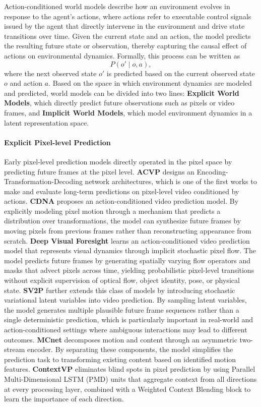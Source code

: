 Action-conditioned world models describe how an environment evolves in response to the agent's actions, where actions refer to executable control signals issued by the agent that directly intervene in the environment and drive state transitions over time. Given the current state and an action, the model predicts the resulting future state or observation, thereby capturing the causal effect of actions on environmental dynamics. Formally, this process can be written as 
$$P\left(o' \mid o, a\right), $$
where the next observed state $o'$ is predicted based on the current observed state $o$ and action $a$. Based on the space in which environment dynamics are modeled and predicted, world models can be divided into two lines: \textbf{Explicit World Models}, which directly predict future observations such as pixels or video frames, and \textbf{Implicit World Models}, which model environment dynamics in a latent representation space.

\paragraph{Explicit Pixel-level Prediction}

Early pixel-level prediction models directly operated in the pixel space by predicting future frames at the pixel level. \textbf{ACVP} \cite{ACVP} designs an Encoding-Transformation-Decoding network architectures, which is one of the first works to make and evaluate long-term predictions on pixel-level video conditioned by actions. \textbf{CDNA} \cite{PixelLevel2} proposes an action-conditioned video prediction model. By explicitly modeling pixel motion through a mechanism that predicts a distribution over transformations, the model can synthesize future frames by moving pixels from previous frames rather than reconstructing appearance from scratch. \textbf{Deep Visual Foresight} \cite{finn2017deepvisualforesightplanning} learns an action-conditioned video prediction model that represents visual dynamics through implicit stochastic pixel flow. The model predicts future frames by generating spatially varying flow operators and masks that advect pixels across time, yielding probabilistic pixel-level transitions without explicit supervision of optical flow, object identity, pose, or physical state. \textbf{SV2P} \cite{babaeizadeh2018stochasticvariationalvideoprediction} further extends this class of models by introducing stochastic variational latent variables into video prediction. By sampling latent variables, the model generates multiple plausible future frame sequences rather than a single deterministic prediction, which is particularly important in real-world and action-conditioned settings where ambiguous interactions may lead to different outcomes. \textbf{MCnet} \cite{PixelLevel3} decomposes motion and content through an asymmetric two-stream encoder. By separating these components, the model simplifies the prediction task to transforming existing content based on identified motion features. \textbf{ContextVP} \cite{PixelLevel4} eliminates blind spots in pixel prediction by using Parallel Multi-Dimensional LSTM (PMD) units that aggregate context from all directions at every processing layer, combined with a Weighted Context Blending block to learn the importance of each direction.

